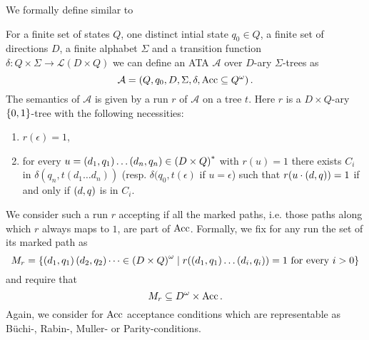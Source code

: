 We formally define similar to \cite{SynProbEnv}
\begin{definition}
  For a finite set of states $Q$, one distinct intial state $q_{0}\in Q$, a
  finite set of directions $D$, a finite alphabet $\Sigma$ and a transition
  function $\delta:Q\times\Sigma\rightarrow\mathcal{L}(D\times Q)$ we can
  define an \ac{ATA} $\mathcal{A}$ over $D$-ary $\Sigma$-trees as
  \begin{equation*}
    \mathcal{A} = \left(Q, q_{0}, D, \Sigma, \delta, \operatorname{Acc}\subseteq Q^{\omega}\right).
  \end{equation*}
  The semantics of $\mathcal{A}$ is given by a run $r$ of $\mathcal{A}$ on a
  tree $t$. Here $r$ is a $D\times Q$-ary $\left\{0,1\right\}$-tree with the following
  necessities:
  \begin{enumerate}
    \item $r(\epsilon) = 1$,
    \item for every $u = \left(d_{1}, q_{1}\right)\dots\left(d_{n}, q_{n}\right)\in
      \left(D\times Q\right)^{*}$ with $r(u) = 1$ there exists $C_{i}$ in
      $\delta(q_{n}, t(d_{1}\dots d_{n}))$ (resp. $\delta(q_{0}, t(\epsilon)$
      if $u = \epsilon$) such that $r(u\cdot\left(d,q\right)) = 1$ if and only if
      $\left(d,q\right)$ is in $C_{i}$.
  \end{enumerate}
  We consider such a run $r$ accepting if all the marked paths, i.e. those
  paths along which $r$ always maps to $1$, are part of $\operatorname{Acc}$. Formally, we
  fix for any run the set of its marked path as
  \begin{equation*}
  M_{r} = \left\{\left(d_{1}, q_{1}\right)\left(d_{2}, q_{2}\right)\dots\in
    \left(D\times Q\right)^{\omega}\mid r(\left(d_{1}, q_{1}\right)\dots
  \left(d_{i}, q_{i}\right)) = 1 \text{ for every }i>0\right\}
  \end{equation*}
  and require that
  \begin{equation*}
    M_{r}\subseteq D^{\omega}\times\operatorname{Acc}.
  \end{equation*}
  Again, we consider for $\operatorname{Acc}$ acceptance conditions which are representable
  as Büchi-, Rabin-, Muller- or Parity-conditions.
\end{definition}

